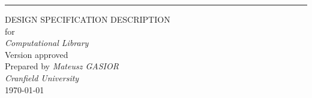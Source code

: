 \begin{flushright}
    \rule{16cm}{5pt}\vskip1cm
    \begin{bfseries}
        \Huge{DESIGN SPECIFICATION DESCRIPTION}\\
        \vspace{1.9cm}
        for\\
        \vspace{1.9cm}
	    \textit{Computational Library}\\
        \vspace{1.9cm}
        \LARGE{Version \myversion approved}\\
        \vspace{1.9cm}
        Prepared by \textit{Mateusz GASIOR}\\
        \vspace{1.9cm}
        \textit{Cranfield University}\\
        \vspace{1.9cm}
        \today\\
    \end{bfseries}
\end{flushright}